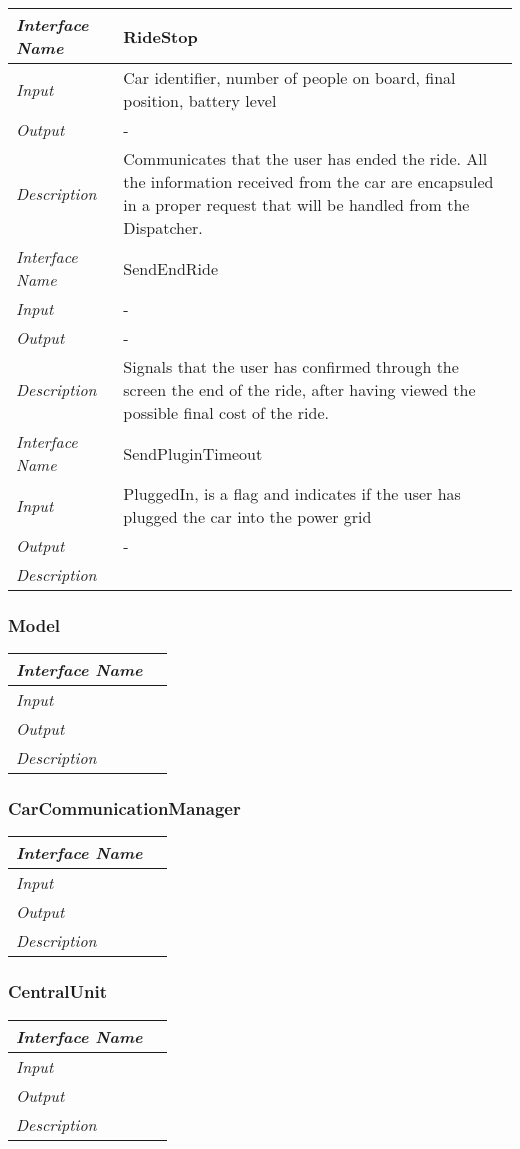 \documentclass[11pt,a4paper]{report}
\begin{document}
\begin{tabularx}{\textwidth}{|>{\em}l|X|}
	\hline
	\hline
	Interface Name& RideStop\\
	\hline
	Input & Car identifier, number of people on board, final position, battery level\\
	\hline
	Output & -\\
	\hline
	Description &Communicates that the user has ended the ride. All the information received from the car are encapsuled in a proper request that will be handled from the Dispatcher.\\
	\hline
	\hline
	Interface Name& SendEndRide\\
	\hline
	Input & -\\
	\hline
	Output & -\\
	\hline
	Description &Signals that the user has confirmed through the screen the end of the ride, after having viewed the possible final cost of the ride.\\
	\hline
	\hline
	Interface Name& SendPluginTimeout\\
	\hline
	Input & PluggedIn, is a flag and indicates if the user has plugged the car into the power grid\\
	\hline
	Output & -\\
	\hline
	Description & \\
	\hline
\end{tabularx}
\subsubsection{Model}
\begin{tabularx}{\textwidth}{|>{\em}l|X|}
	\hline
	Interface Name& \\
	\hline
	Input & \\
	\hline
	Output & \\
	\hline
	Description &\\
	\hline
\end{tabularx}
\subsubsection{CarCommunicationManager}
\begin{tabularx}{\textwidth}{|>{\em}l|X|}
	\hline
	Interface Name& \\
	\hline
	Input & \\
	\hline
	Output & \\
	\hline
	Description &\\
	\hline
\end{tabularx}
\subsubsection{CentralUnit}
\begin{tabularx}{\textwidth}{|>{\em}l|X|}
	\hline
	Interface Name& \\
	\hline
	Input & \\
	\hline
	Output & \\
	\hline
	Description &\\
	\hline
\end{tabularx}
\end{document}
